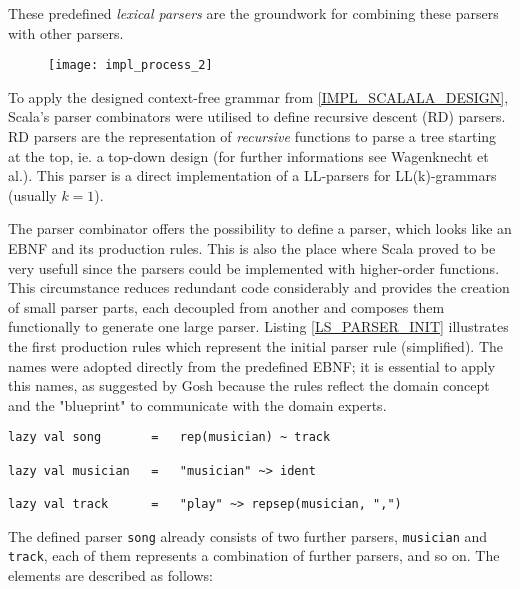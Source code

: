 These predefined \textit{lexical parsers} are the groundwork for combining these parsers with other parsers.

\begin{figure}[h]
\centering
\texttt{[image: impl\_process\_2]}
\end{figure}

To apply the designed context-free grammar from \ref{IMPL_SCALALA_DESIGN}, Scala's parser combinators were utilised to define recursive descent (RD) parsers. RD parsers are the representation of \textit{recursive} functions to parse a tree starting at the top, ie. a top-down design (for further informations see Wagenknecht et al.\cite{Wagenknecht2014}). This parser is a direct implementation of a LL-parsers for LL(k)-grammars (usually $k = 1$).\cite{Ghosh2010}

The parser combinator offers the possibility to define a parser, which looks like an EBNF and its production rules. This is also the place where Scala proved to be very usefull since the parsers could be implemented with higher-order functions. This circumstance reduces redundant code considerably and provides the creation of small parser parts, each decoupled from another and composes them functionally to generate one large parser. Listing \ref{LS_PARSER_INIT} illustrates the first production rules which represent the initial parser rule (simplified). The names were adopted directly from the predefined EBNF; it is essential to apply this names, as suggested by Gosh because the rules reflect the domain concept and the "blueprint" to communicate with the domain experts.\cite{Ghosh2010}

\begin{lstlisting}[caption={Initial parser combinator rules. (simplified)}, label=LS_PARSER_INIT]
lazy val song		=	rep(musician) ~ track

lazy val musician	=	"musician" ~> ident

lazy val track		=	"play" ~> repsep(musician, ",")
\end{lstlisting}

The defined parser \texttt{song} already consists of two further parsers, \texttt{musician} and \texttt{track}, each of them represents a combination of further parsers, and so on. The elements are described as follows:

